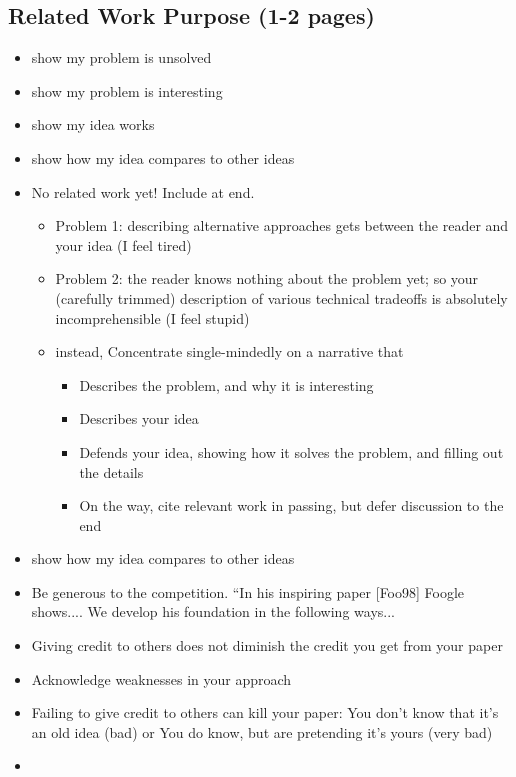 \subsection{Related Work Purpose (1-2 pages)}
\begin{itemize}
\item show my problem is unsolved
\item show my problem is interesting
\item show my idea works
\item show how my idea compares to other ideas
\end{itemize}

\begin{itemize}
\item No related work yet! Include at end.
\begin{itemize}
    \item Problem 1: describing alternative approaches gets between the reader and your idea (I feel tired)
    \item Problem 2: the reader knows nothing
    about the problem yet; so your (carefully
    trimmed) description of various technical
    tradeoffs is absolutely incomprehensible (I feel stupid)
    \item instead, Concentrate single-mindedly on a narrative that
    \begin{itemize}
        \item Describes the problem, and why it is interesting
        \item Describes your idea
        \item Defends your idea, showing how it solves the problem,
and filling out the details
        \item On the way, cite relevant work in passing, but defer
discussion to the end
    \end{itemize}
\end{itemize}

\item show how my idea compares to other ideas
\item Be generous to the competition. “In his inspiring paper
[Foo98] Foogle shows.... We develop his foundation in the
following ways...
\item Giving credit to others does not diminish
the credit you get from your paper
\item Acknowledge weaknesses in your approach
\item Failing to give credit to others can kill
your paper: You don't know that it's an old idea (bad) or You do know, but are pretending it's yours (very bad)

\item 

\end{itemize}

